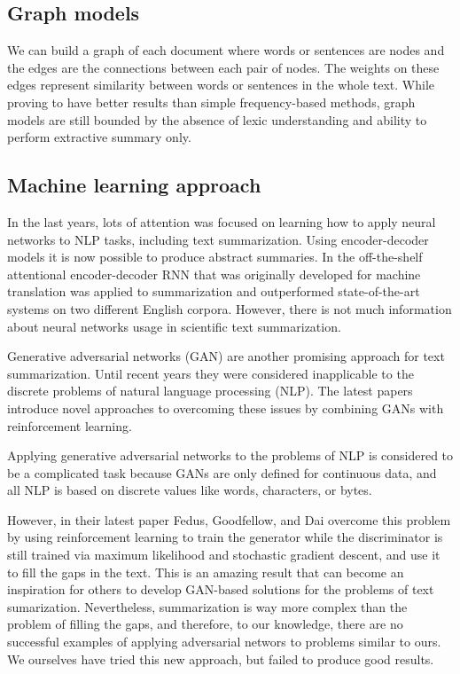 \documentclass[sigplan]{acmart}
\begin{document}
\subsection{Graph models}

We can build a graph of each document where words or sentences are nodes and the edges are the connections between each pair of nodes. The weights on these edges represent similarity between words or sentences in the whole text. While proving to have better results than simple frequency-based methods, graph models are still bounded by the absence of lexic understanding and ability to perform extractive summary only.

\subsection{Machine learning approach}
\label{sec:ml}

In the last years, lots of attention was focused on learning how to apply neural networks to NLP tasks, including text summarization. Using encoder-decoder models it is now possible to produce abstract summaries. In \cite{nallapati-16} the off-the-shelf attentional encoder-decoder RNN that was originally developed for machine translation was applied to summarization and outperformed state-of-the-art systems on two different English corpora. However, there is not much information about neural networks usage in scientific text summarization.

Generative adversarial networks (GAN) are another promising approach for text summarization. Until recent years they were considered inapplicable to the discrete problems of natural language processing (NLP). The latest papers introduce novel approaches to overcoming these issues by combining GANs with reinforcement learning.

Applying generative adversarial networks to the problems of NLP is considered to be a complicated task because GANs are only defined for continuous data, and all NLP is based on discrete values like words, characters, or bytes.

However, in their latest paper Fedus, Goodfellow, and Dai\cite{fedus-18} overcome this problem by using reinforcement learning to train the generator while the discriminator is still trained via maximum likelihood and stochastic gradient descent, and use it to fill the gaps in the text. This is an amazing result that can become an inspiration for others to develop GAN-based solutions for the problems of text sumarization. Nevertheless, summarization is way more complex than the problem of filling the gaps, and therefore, to our knowledge, there are no successful examples of applying adversarial networs to problems similar to ours. We ourselves have tried this new approach, but failed to produce good results.
\end{document}
